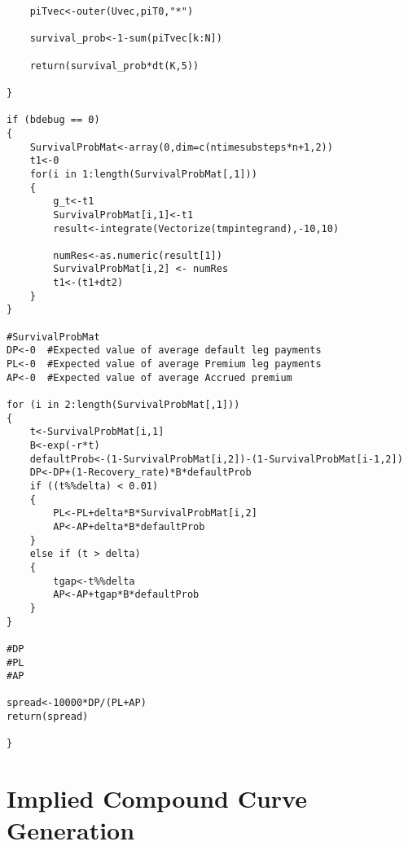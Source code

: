 \begin{singlespace}
\begin{lstlisting}
	piTvec<-outer(Uvec,piT0,"*")
	
	survival_prob<-1-sum(piTvec[k:N]) 
	
	return(survival_prob*dt(K,5))

}  

if (bdebug == 0)	
{
	SurvivalProbMat<-array(0,dim=c(ntimesubsteps*n+1,2))	
	t1<-0
	for(i in 1:length(SurvivalProbMat[,1]))
	{ 		
		g_t<-t1  		
		SurvivalProbMat[i,1]<-t1 
		result<-integrate(Vectorize(tmpintegrand),-10,10)

		numRes<-as.numeric(result[1])
		SurvivalProbMat[i,2] <- numRes
		t1<-(t1+dt2)  	
	} 
}

#SurvivalProbMat  
DP<-0  #Expected value of average default leg payments 
PL<-0  #Expected value of average Premium leg payments 
AP<-0  #Expected value of average Accrued premium  

for (i in 2:length(SurvivalProbMat[,1]))
{ 	
	t<-SurvivalProbMat[i,1] 	
	B<-exp(-r*t)  	
	defaultProb<-(1-SurvivalProbMat[i,2])-(1-SurvivalProbMat[i-1,2])  	
	DP<-DP+(1-Recovery_rate)*B*defaultProb  
	if ((t%%delta) < 0.01) 		
	{
		PL<-PL+delta*B*SurvivalProbMat[i,2]  		
		AP<-AP+delta*B*defaultProb  			
	}
	else if (t > delta)
	{
		tgap<-t%%delta 		
		AP<-AP+tgap*B*defaultProb  	
	}
}

#DP 
#PL 
#AP  

spread<-10000*DP/(PL+AP)
return(spread)

}

\end{lstlisting}
\end{singlespace}




\section{Implied Compound Curve Generation}\label{sec:imp}

